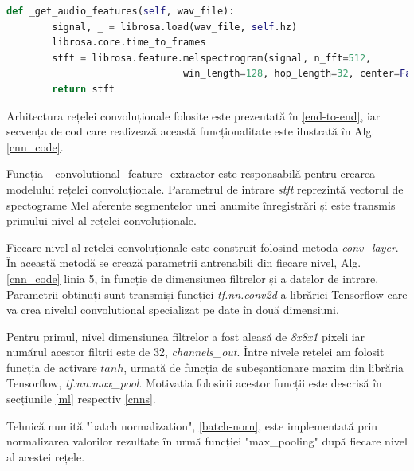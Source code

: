 \documentclass[a4paper,12pt]{book}
\begin{document}
				\begin{lstlisting}[language=Python, caption={Extragerea spectogramei Mel, 3.4.1, folosind libraria librosa.}, xleftmargin=0cm]
  def _get_audio_features(self, wav_file):
		signal, _ = librosa.load(wav_file, self.hz)
		librosa.core.time_to_frames
		stft = librosa.feature.melspectrogram(signal, n_fft=512, 
							   win_length=128, hop_length=32, center=False)
		return stft	\end{lstlisting} \par
				Arhitectura rețelei convoluționale folosite este prezentată în \ref{end-to-end}, iar secvența de cod care realizează această funcționalitate este ilustrată în Alg. \ref{cnn_code}. \par 
				Funcția \_convolutional\_feature\_extractor este responsabilă pentru crearea modelului rețelei convoluționale. Parametrul de intrare \textit{stft} reprezintă vectorul de spectograme Mel aferente segmentelor unei anumite înregistrări și este transmis primului nivel al rețelei convoluționale. \par
				Fiecare nivel al rețelei convoluționale este construit folosind metoda \textit{conv\_layer}. În această metodă se crează parametrii antrenabili din fiecare nivel, Alg.\ref{cnn_code} linia 5, în funcție de dimensiunea filtrelor și a datelor de intrare. Parametrii obținuți sunt transmiși funcției \textit{tf.nn.conv2d} a librăriei Tensorflow care va crea nivelul convolutional specializat pe date în două dimensiuni. \par
				Pentru primul, nivel dimensiunea filtrelor a fost aleasă de \textit{8x8x1} pixeli iar numărul acestor filtrii este de 32, \textit{channels\_out}. Între nivele rețelei am folosit funcția de activare $tanh$, urmată de funcția de subeșantionare maxim din librăria Tensorflow, \textit{tf.nn.max\_pool}. Motivația folosirii acestor funcții este descrisă în secțiunile \ref{ml} respectiv \ref{cnns}.
				
				Tehnică numită "batch normalization", \ref{batch-norn}, este implementată prin normalizarea  valorilor rezultate în urmă funcției  "max\_pooling" după fiecare nivel al acestei rețele. \par 
				
\end{document}
